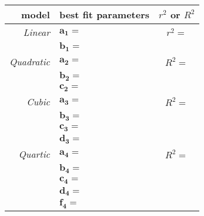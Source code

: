 \begin{center}
\renewcommand{\arraystretch}{1.4}
\begin{tabular}{r|l|c}
    \toprule 
    model & best fit parameters & $r^2$ or $R^2$ \\ 
    \toprule
    {\itshape Linear} 
        & $\bm{a_1} =$ \underline{\hspace{0.5in}} & $r^2 =$ \underline{\hspace{0.5in}} \\
        & $\bm{b_1} =$ \underline{\hspace{0.5in}} & \\
    \midrule
    {\itshape Quadratic} 
        & $\bm{a_2} =$ \underline{\hspace{0.5in}} & $R^2 =$ \underline{\hspace{0.5in}} \\
        & $\bm{b_2} =$ \underline{\hspace{0.5in}} & \\
        & $\bm{c_2} =$ \underline{\hspace{0.5in}} & \\
    \midrule
    {\itshape Cubic} 
        & $\bm{a_3} =$ \underline{\hspace{0.5in}} & $R^2 =$ \underline{\hspace{0.5in}} \\
        & $\bm{b_3} =$ \underline{\hspace{0.5in}} & \\
        & $\bm{c_3} =$ \underline{\hspace{0.5in}} & \\
        & $\bm{d_3} =$ \underline{\hspace{0.5in}} & \\
    \midrule
    {\itshape Quartic} 
        & $\bm{a_4} =$ \underline{\hspace{0.5in}} & $R^2 =$ \underline{\hspace{0.5in}} \\
        & $\bm{b_4} =$ \underline{\hspace{0.5in}} & \\
        & $\bm{c_4} =$ \underline{\hspace{0.5in}} & \\
        & $\bm{d_4} =$ \underline{\hspace{0.5in}} & \\
        & $\bm{f_4} =$ \underline{\hspace{0.5in}} & \\
    \midrule

\end{tabular}
\end{center}
